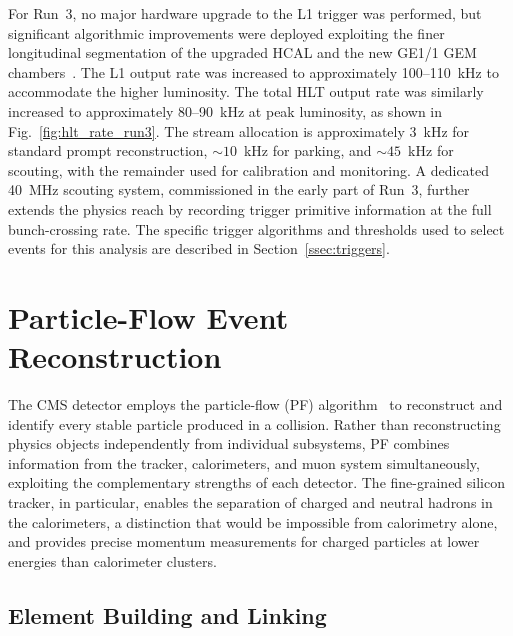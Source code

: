 For Run~3, no major hardware upgrade to the L1 trigger was performed, but significant algorithmic improvements were deployed exploiting the finer longitudinal segmentation of the upgraded HCAL and the new GE1/1 GEM chambers~\cite{CMS:2023gfb}. The L1 output rate was increased to approximately 100--110~kHz to accommodate the higher luminosity. The total HLT output rate was similarly increased to approximately 80--90~kHz at peak luminosity, as shown in Fig.~\ref{fig:hlt_rate_run3}. The stream allocation is approximately 3~kHz for standard prompt reconstruction, ${\sim}10$~kHz for parking, and ${\sim}45$~kHz for scouting, with the remainder used for calibration and monitoring. A dedicated 40~MHz scouting system, commissioned in the early part of Run~3, further extends the physics reach by recording trigger primitive information at the full bunch-crossing rate. The specific trigger algorithms and \pT thresholds used to select events for this analysis are described in Section~\ref{ssec:triggers}.

\section{Particle-Flow Event Reconstruction}
\label{sec:pf}

The CMS detector employs the particle-flow (PF) algorithm~\cite{CMS:2017yfk} to reconstruct and identify every stable particle produced in a collision. Rather than reconstructing physics objects independently from individual subsystems, PF combines information from the tracker, calorimeters, and muon system simultaneously, exploiting the complementary strengths of each detector. The fine-grained silicon tracker, in particular, enables the separation of charged and neutral hadrons in the calorimeters, a distinction that would be impossible from calorimetry alone, and provides precise momentum measurements for charged particles at lower energies than calorimeter clusters.

\subsection*{Element Building and Linking}

